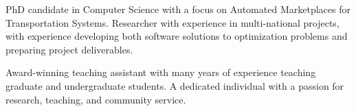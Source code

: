 

\begin{cvparagraph}

PhD candidate in Computer Science with a focus on Automated Marketplaces for Transportation Systems. Researcher with experience in multi-national projects, with experience developing both software solutions to optimization problems and preparing project deliverables.

Award-winning teaching assistant with many years of experience teaching graduate and undergraduate students. A dedicated individual with a passion for research, teaching, and community service. 


\end{cvparagraph}